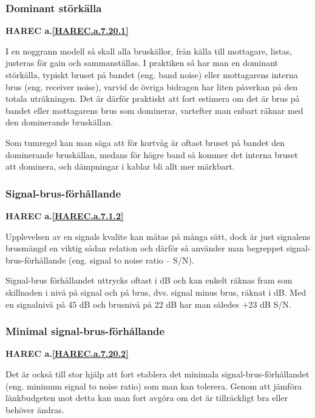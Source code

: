 \subsubsection{Dominant störkälla}
\textbf{HAREC a.\ref{HAREC.a.7.20.1}\label{myHAREC.a.7.20.1}}

I en noggrann modell så skall alla bruskällor, från källa till mottagare,
listas, justeras för gain och sammanställas.
I praktiken så har man en dominant störkälla, typiskt bruset på bandet
(eng. band noise) eller mottagarens interna brus (eng. receiver noise),
varvid de övriga bidragen har liten påverkan på den totala uträkningen.
Det är därför praktiskt att fort estimera om det är brus på bandet eller
mottagarens brus som dominerar, vartefter man enbart räknar med den
dominerande bruskällan.

Som tumregel kan man säga att för kortvåg är oftast bruset på bandet
den dominerande bruskällan, medans för högre band så kommer det interna
bruset att dominera, och dämpningar i kablar bli allt mer märkbart.

\subsubsection{Signal-brus-förhållande}
\textbf{HAREC a.\ref{HAREC.a.7.1.2}\label{myHAREC.a.7.1.2}}

Upplevelsen av en signals kvalite kan mätas på många sätt, dock är just
signalens brusmängd en viktig sådan relation och därför så använder man
begreppet signal-brus-förhållande (eng. signal to noise ratio -- S/N).

Signal-brus förhållandet uttrycks oftast i dB och kan enkelt räknas fram
som skillnaden i nivå på signal och på brus, dvs. signal minus brus, räknat i
dB. Med en signalnivå på 45 dB och brusnivå på 22 dB har man således +23 dB
S/N.

\subsubsection{Minimal signal-brus-förhållande}
\textbf{HAREC a.\ref{HAREC.a.7.20.2}\label{myHAREC.a.7.20.2}}

Det är också till stor hjälp att fort etablera det minimala
signal-brus-förhållandet (eng. minimum signal to noise ratio)
som man kan tolerera.
Genom att jämföra länkbudgeten mot detta kan man fort avgöra om det är
tillräckligt bra eller behöver ändras.

